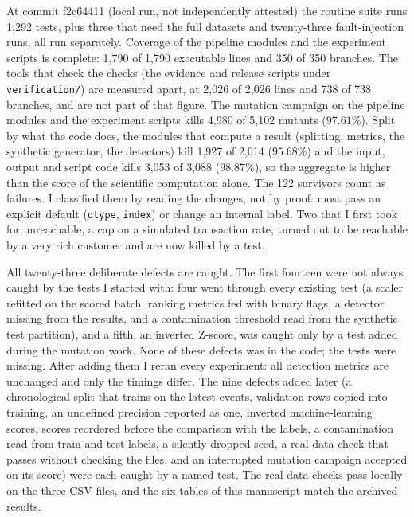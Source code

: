 \documentclass[conference]{IEEEtran}
\begin{document}
At commit f2c64411 (local run, not independently attested) the routine suite runs 1,292 tests, plus three that need
the full datasets and twenty-three fault-injection runs, all run separately.
Coverage of the pipeline modules and the experiment scripts is complete: 1,790 of
1,790 executable lines and 350 of 350 branches. The tools that check the
checks (the evidence and release scripts under \texttt{verification/}) are
measured apart, at 2,026 of 2,026 lines and 738 of 738 branches, and are not part of
that figure. The mutation campaign on the pipeline modules and the experiment
scripts kills 4,980 of 5,102 mutants ($97.61\%$). Split by what the code does,
the modules that compute a result (splitting, metrics, the synthetic generator,
the detectors) kill 1,927 of 2,014 ($95.68\%$) and the input, output and script
code kills 3,053 of 3,088 ($98.87\%$), so the aggregate is higher than the score
of the scientific computation alone. The 122 survivors count as failures. I
classified them by reading the changes, not by proof: most pass an explicit
default (\texttt{dtype}, \texttt{index}) or change an internal label. Two that
I first took for unreachable, a cap on a simulated transaction rate, turned out
to be reachable by a very rich customer and are now killed by a test.

All twenty-three deliberate defects are caught. The first fourteen were not
always caught by the tests I started with: four went through every existing test
(a scaler refitted on the scored batch, ranking metrics fed with binary flags, a
detector missing from the results, and a contamination threshold read from the
synthetic test partition), and a fifth, an inverted Z-score, was caught only by a
test added during the mutation work. None of these defects was in the code; the
tests were missing. After adding them I reran every experiment: all detection
metrics are unchanged and only the timings differ. The nine defects added later
(a chronological split that trains on the latest events, validation rows copied
into training, an undefined precision reported as one, inverted machine-learning
scores, scores reordered before the comparison with the labels, a contamination
read from train and test labels, a silently dropped seed, a real-data check that
passes without checking the files, and an interrupted mutation campaign accepted
on its score) were each caught by a named test.
The real-data checks pass
locally on the three CSV files, and the six tables of this manuscript match
the archived results.
\end{document}
